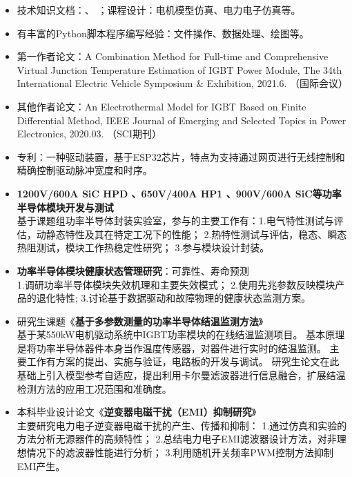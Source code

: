 \documentclass[zh]{resume}
\begin{document}
\begin{itemize}
  \item 技术知识文档：、
  ；课程设计：电机模型仿真、电力电子仿真等。
  \item 有丰富的Python脚本程序编写经验：文件操作、数据处理、绘图等。
  \item 第一作者论文：{\small A Combination Method for Full-time and Comprehensive Virtual Junction Temperature Estimation of IGBT Power Module, The 34th International Electric Vehicle Symposium \& Exhibition, 2021.6. （国际会议）}
  \item 其他作者论文：{\small An Electrothermal Model for IGBT Based on Finite Differential Method, IEEE Journal of Emerging and Selected Topics in Power Electronics, 2020.03. 
  （SCI期刊） }
  \item 专利：一种驱动装置，基于ESP32芯片，特点为支持通过网页进行无线控制和精确控制驱动脉冲宽度和时序。
\end{itemize}

\begin{itemize}
  \item \textbf{1200V/600A SiC HPD 、650V/400A HP1 、900V/600A SiC等功率半导体模块开发与测试}\\
  {\small 基于课题组功率半导体封装实验室，参与的主要工作有：1.电气特性测试与评估，动静态特性及其在特定工况下的性能；
  2.热特性测试与评估，稳态、瞬态热阻测试，模块工作热稳定性研究；
  3.参与模块设计封装。}
  \item \textbf{功率半导体模块健康状态管理研究}：可靠性、寿命预测\\ 
  {\small 1.调研功率半导体模块失效机理和主要失效模式；
  2.使用先兆参数反映模块产品的退化特性;
  3.讨论基于数据驱动和故障物理的健康状态监测方案。}
  \item 研究生课题《\textbf{基于多参数测量的功率半导体结温监测方法}》\\
  {\small 基于某550kW电机驱动系统中IGBT功率模块的在线结温监测项目。
  基本原理是将功率半导体器件本身当作温度传感器，对器件进行实时的结温监测。
  主要工作有方案的提出、实施与验证，电路板的开发与调试。
  研究生论文在此基础上引入模型参考自适应，提出利用卡尔曼滤波器进行信息融合，扩展结温检测方法的应用工况范围和准确度。}
  \item 本科毕业设计论文《\textbf{逆变器电磁干扰（EMI）抑制研究}》\\ 
  {\small 主要研究电力电子逆变器电磁干扰的产生、传播和抑制：
  1.通过仿真和实验的方法分析无源器件的高频特性；
  2.总结电力电子EMI滤波器设计方法，对非理想情况下的滤波器性能进行分析；
  3.利用随机开关频率PWM控制方法抑制EMI产生。}
  
\end{itemize}
\end{document}

